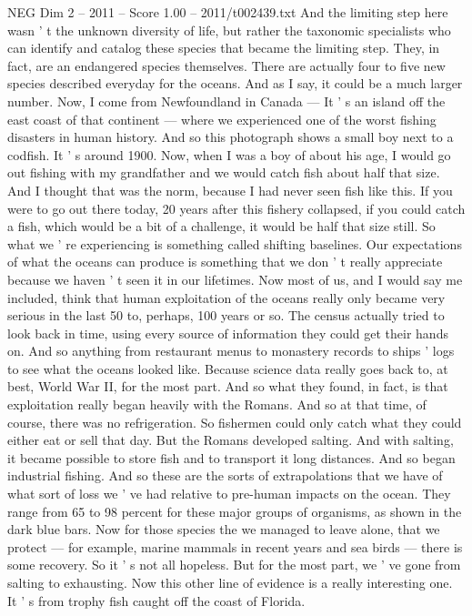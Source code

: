 \begin{textsample}{NEG Dim 2 – 2011 – Score 1.00 – 2011/t002439.txt}
And the limiting step here wasn ' t the unknown diversity of life, but rather the taxonomic specialists who can identify and catalog these species that became the limiting step.
They, in fact, are an endangered species themselves.
There are actually four to five new species described everyday for the oceans.
And as I say, it could be a much larger number.
Now, I come from Newfoundland in Canada — It ' s an island off the east coast of that continent — where we experienced one of the worst fishing disasters in human history.
And so this photograph shows a small boy next to a codfish.
It ' s around 1900.
Now, when I was a boy of about his age, I would go out fishing with my grandfather and we would catch fish about half that size.
And I thought that was the norm, because I had never seen fish like this.
If you were to go out there today, 20 years after this fishery collapsed, if you could catch a fish, which would be a bit of a challenge, it would be half that size still.
So what we ' re experiencing is something called shifting baselines.
Our expectations of what the oceans can produce is something that we don ' t really appreciate because we haven ' t seen it in our lifetimes.
Now most of us, and I would say me included, think that human exploitation of the oceans really only became very serious in the last 50 to, perhaps, 100 years or so.
The census actually tried to look back in time, using every source of information they could get their hands on.
And so anything from restaurant menus to monastery records to ships ' logs to see what the oceans looked like.
Because science data really goes back to, at best, World War II, for the most part.
And so what they found, in fact, is that exploitation really began heavily with the Romans.
And so at that time, of course, there was no refrigeration.
So fishermen could only catch what they could either eat or sell that day.
But the Romans developed salting.
And with salting, it became possible to store fish and to transport it long distances.
And so began industrial fishing.
And so these are the sorts of extrapolations that we have of what sort of loss we ' ve had relative to pre-human impacts on the ocean.
They range from 65 to 98 percent for these major groups of organisms, as shown in the dark blue bars.
Now for those species the we managed to leave alone, that we protect — for example, marine mammals in recent years and sea birds — there is some recovery.
So it ' s not all hopeless.
But for the most part, we ' ve gone from salting to exhausting.
Now this other line of evidence is a really interesting one.
It ' s from trophy fish caught off the coast of Florida.

\end{textsample}
